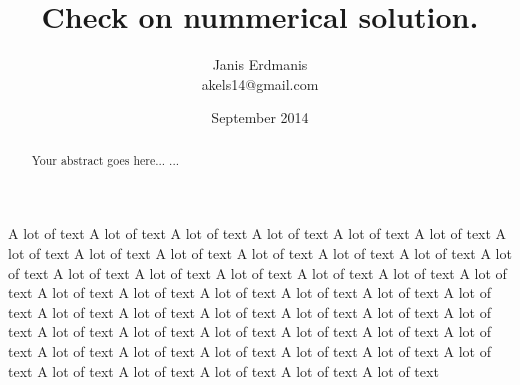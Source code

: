 \documentclass[tightenline,notitlepage,nofootinbib]{revtex4-1}
\begin{document}
  \title{Check on nummerical solution.}
  \author{Janis Erdmanis \\ akels14@gmail.com}
  \date{September 2014}
  \maketitle

\begin{abstract}
Your abstract goes here...
...
\end{abstract}
  

A lot of text A lot of text A lot of text A lot of text A lot of text A lot of text A lot of text A lot of text A lot of text A lot of text A lot of text A lot of text A lot of text A lot of text A lot of text A lot of text A lot of text A lot of text A lot of text A lot of text A lot of text A lot of text A lot of text A lot of text A lot of text A lot of text A lot of text A lot of text A lot of text A lot of text A lot of text A lot of text A lot of text A lot of text A lot of text A lot of text A lot of text A lot of text A lot of text A lot of text A lot of text A lot of text A lot of text A lot of text A lot of text A lot of text A lot of text A lot of text 

     
     
     
  
\end{document}
